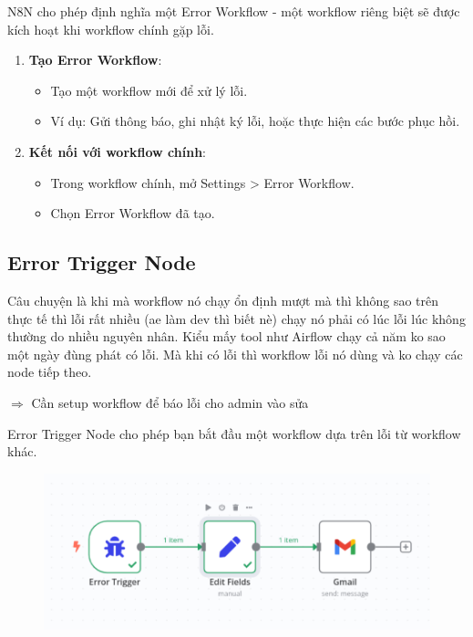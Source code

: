 N8N cho phép định nghĩa một Error Workflow - một workflow riêng biệt sẽ được kích hoạt khi workflow chính gặp lỗi.

\begin{enumerate}
  \item \textbf{Tạo Error Workflow}:
  \begin{itemize}
    \item Tạo một workflow mới để xử lý lỗi.
    \item Ví dụ: Gửi thông báo, ghi nhật ký lỗi, hoặc thực hiện các bước phục hồi.
  \end{itemize}

  \item \textbf{Kết nối với workflow chính}:
  \begin{itemize}
    \item Trong workflow chính, mở Settings > Error Workflow.
    \item Chọn Error Workflow đã tạo.
  \end{itemize}
\end{enumerate}



\subsection{Error Trigger Node}

Câu chuyện là khi mà workflow nó chạy ổn định mượt mà thì không sao trên thực tế thì lỗi rất nhiều (ae làm dev thì biết nè) chạy nó phải có lúc lỗi lúc không thường do nhiều nguyên nhân. Kiểu mấy tool như Airflow chạy cả năm ko sao một ngày đùng phát có lỗi. Mà khi có lỗi thì workflow lỗi nó dùng và ko chạy các node tiếp theo. 

$\Rightarrow$ Cần setup workflow để báo lỗi cho admin vào sửa


Error Trigger Node cho phép bạn bắt đầu một workflow dựa trên lỗi từ workflow khác.

\begin{figure}[htbp]
    \centering
    \includegraphics[width=1\linewidth]{Chap1-7/error.pdf}
\end{figure}

